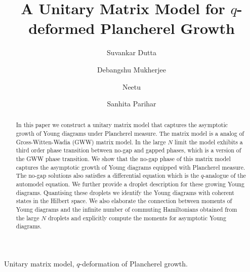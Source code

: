 \documentclass[3p,12pt]{elsarticle}
\numberwithin{equation}{section}
\begin{document}
	
\begin{frontmatter}
\title{A Unitary Matrix Model for $q$-deformed Plancherel Growth}
\author[1]{Suvankar Dutta}
\author[2]{Debangshu Mukherjee}
\author[1]{Neetu}
\author[1]{Sanhita Parihar}
\address[1]{Department of Physics Indian Institute of Science Education and Research  Bhopal,\\ Bhopal bypass, Bhopal 462066, India}
\address[2]{Indian Institute of Science Education and Research  Thiruvananthapuram,\\ Maruthamala PO, Vithura, Thiruvananthapuram - 695551, Kerala, India.}

		
\begin{abstract}
In this paper we construct a unitary matrix model that captures the asymptotic growth of Young diagrams under \qd Plancherel measure. The matrix model is a \qq analog of Gross-Witten-Wadia (GWW) matrix model. In the large $N$ limit the model exhibits a third order phase transition between no-gap and gapped phases, which is a \qd version of the GWW phase transition. We show that the no-gap phase of this matrix model captures the asymptotic growth of Young diagrams equipped with \qd Plancherel measure. The no-gap solutions also satisfies a differential equation which is the $q$-analogue of the automodel equation. We further provide a droplet description for these growing Young diagrams. Quantising these droplets we identify the Young diagrams with coherent states in the Hilbert space. We also elaborate the connection between moments of Young diagrams and the infinite number of commuting Hamiltonians obtained from the large $N$ droplets and explicitly compute the moments for asymptotic Young diagrams.
\end{abstract}
		
\begin{keyword}
Unitary matrix model, $q$-deformation of Plancherel growth.
\end{keyword}
		
	\end{frontmatter}
	





\tableofcontents
\end{document}
